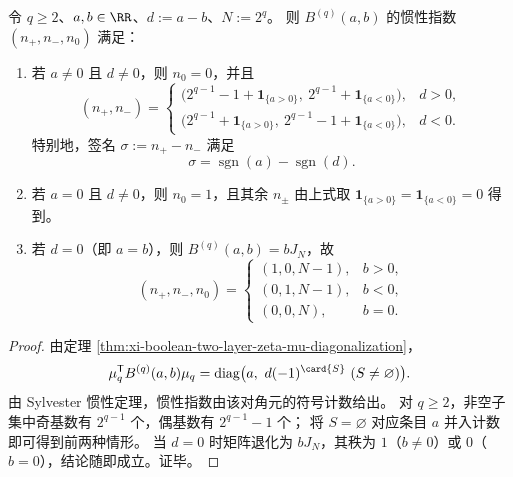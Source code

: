 \begin{theorem}[全空间实惯性指数的显式计数]\label{thm:xi-boolean-two-layer-inertia-count}
令 \(q\ge 2\)、\(a,b\in\RR\)、\(d:=a-b\)、\(N:=2^q\)。
则 \(B^{(q)}(a,b)\) 的惯性指数 \((n_+,n_-,n_0)\) 满足：
\begin{enumerate}
  \item 若 \(a\neq 0\) 且 \(d\neq 0\)，则 \(n_0=0\)，并且
  \[
  (n_+,n_-)=
  \begin{cases}
  \bigl(2^{q-1}-1+\mathbf 1_{\{a>0\}},\ 2^{q-1}+\mathbf 1_{\{a<0\}}\bigr),&d>0,\\[2mm]
  \bigl(2^{q-1}+\mathbf 1_{\{a>0\}},\ 2^{q-1}-1+\mathbf 1_{\{a<0\}}\bigr),&d<0.
  \end{cases}
  \]
  特别地，签名 \(\sigma:=n_+-n_-\) 满足
  \[
  \sigma=\operatorname{sgn}(a)-\operatorname{sgn}(d).
  \]
  \item 若 \(a=0\) 且 \(d\neq 0\)，则 \(n_0=1\)，且其余 \(n_\pm\) 由上式取
  \(\mathbf 1_{\{a>0\}}=\mathbf 1_{\{a<0\}}=0\) 得到。
  \item 若 \(d=0\)（即 \(a=b\)），则 \(B^{(q)}(a,b)=bJ_N\)，故
  \[
  (n_+,n_-,n_0)=
  \begin{cases}
  (1,0,N-1),&b>0,\\
  (0,1,N-1),&b<0,\\
  (0,0,N),&b=0.
  \end{cases}
  \]
\end{enumerate}
\end{theorem}
\begin{proof}
由定理 \ref{thm:xi-boolean-two-layer-zeta-mu-diagonalization}，
\[
\mu_q^{\mathsf T}B^{(q)}(a,b)\mu_q
=\operatorname{diag}\bigl(a,\ d(-1)^{\card{S}}\ (S\neq\varnothing)\bigr).
\]
由 Sylvester 惯性定理，惯性指数由该对角元的符号计数给出。
对 \(q\ge 2\)，非空子集中奇基数有 \(2^{q-1}\) 个，偶基数有 \(2^{q-1}-1\) 个；
将 \(S=\varnothing\) 对应条目 \(a\) 并入计数即可得到前两种情形。
当 \(d=0\) 时矩阵退化为 \(bJ_N\)，其秩为 \(1\)（\(b\neq 0\)）或 \(0\)（\(b=0\)），结论随即成立。证毕。
\end{proof}

